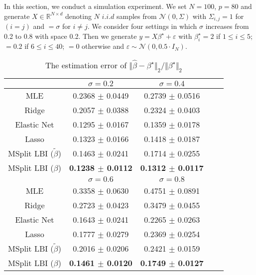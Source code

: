 \documentclass{article}
\providecommand{\tabularnewline}{\\}
\begin{document}
In this section, we conduct a simulation experiment. We set $N=100$,
$p=80$ and generate $X\in\mathbb{R}^{N\times d}$ denoting $N$ $i.i.d$
samples from $\mathcal{N}(0,\Sigma)$ with $\Sigma_{i,j}=1$ for $(i=j)$
and $=\sigma$ for $i\neq j$. We consider four settings in which
$\sigma$ increases from 0.2 to 0.8 with space 0.2. Then we generate
$y=X\beta^{\star}+\varepsilon$ with $\beta_{i}^{\star}=2$ if $1\leq i\leq5$;
$=0.2$ if $6\leq i\leq40$; $=0$ otherwise and $\varepsilon\sim\mathcal{N}(0,0.5\cdot I_{N})$.


\begin{table}[]
\begin{centering}
\small
\begin{tabular}{ccccc}
\hline
 & {\small{}{}{}{}$\sigma=0.2$}  & {\small{}{}{}{}$\sigma=0.4$}  \tabularnewline
\hline
\hline{\small{}{}{}{}MLE}  & {\small{}{}{}{}0.2368 $\pm$ 0.0449}  & {\small{}{}{}{}0.2739 $\pm$ 0.0516 }  \tabularnewline
\hline{\small{}{}{}{}Ridge}  & {\small{}{}{}{}0.2057 $\pm$ 0.0388}  & {\small{}{}{}{}0.2324 $\pm$ 0.0403} \tabularnewline
\hline{\small{}{}{}{}Elastic Net}  & {\small{}{}{}{}0.1295 $\pm$ 0.0167}  & {\small{}{}{}{}0.1359 $\pm$ 0.0178}  \tabularnewline
\hline{\small{}{}{}{}Lasso}  & {\small{}{}{}{}0.1323 $\pm$ 0.0166}  & {\small{}{}{}{}0.1418 $\pm$ 0.0187}  \tabularnewline
\hline{\small{}{}{}{}MSplit LBI ($\tilde{\beta}$)}  & {\small{}{}{}{}0.1463 $\pm$ 0.0241}  & {\small{}{}{}{}0.1714 $\pm$ 0.0255}  \tabularnewline
\hline{\small{}{}{}{}MSplit LBI ($\beta$){}{}}  & \textbf{\small{}{}{}{}0.1238 $\pm$ 0.0112}{\small{}{}{}{}}  & \textbf{\small{}{}{}{}0.1312 $\pm$ 0.0117}{\small{}{}{}{}}  \tabularnewline
\midrule
& {\small{}{}{}{}$\sigma=0.6$}  & {\small{}{}{}{}$\sigma=0.8$ } \tabularnewline
\hline
\hline{\small{}{}{}{}MLE} & {\small{}{}{}{}0.3358 $\pm$ 0.0630}  & {\small{}{}{}{}0.4751  $\pm$ 0.0891}  \tabularnewline
\hline{\small{}{}{}{}Ridge} & {\small{}{}{}{}0.2723 $\pm$ 0.0423}  & {\small{}{}{}{}0.3479  $\pm$ 0.0455}  \tabularnewline
\hline{\small{}{}{}{}Elastic Net} & {\small{}{}{}{}0.1643 $\pm$ 0.0241}  & {\small{}{}{}{}0.2265  $\pm$ 0.0263}\tabularnewline
\hline{\small{}{}{}{}Lasso} & {\small{}{}{}{}0.1777 $\pm$ 0.0279}  & {\small{}{}{}{}0.2369  $\pm$ 0.0254} \tabularnewline
\hline{\small{}{}{}{}MSplit LBI ($\tilde{\beta}$)} & {\small{}{}{}{}0.2016 $\pm$ 0.0206}  & {\small{}{}{}{}0.2421  $\pm$ 0.0159} \tabularnewline
\hline{\small{}{}{}{}MSplit LBI ($\beta$){}{}} & \textbf{\small{}{}{}{}0.1461 $\pm$ 0.0120}{\small{}{}{}{}}  & \textbf{\small{}{}{}{}0.1749 $\pm$ 0.0127}{\small{}{}{}{} } \tabularnewline
\hline
\end{tabular}
\par\end{centering}
\caption{The estimation error of $\Vert\hat{\beta}-\beta^{\star}\Vert_{2} / \Vert\beta^{\star}\Vert_{2}$}
\label{table:acc}{\small{}{\small{}\vspace{-0.1in}}}{\small \par}
\end{table}
\end{document}
